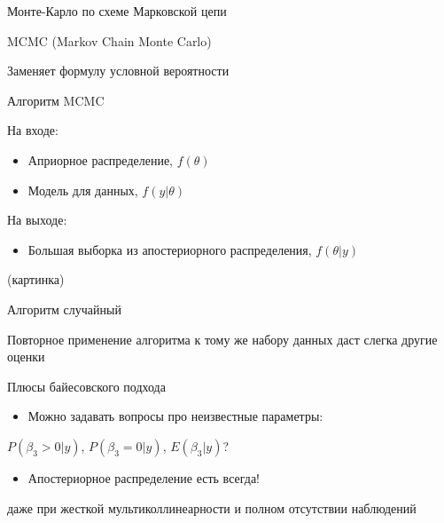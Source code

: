\documentclass[ignorenonframetext,]{beamer}
\begin{document}
\begin{frame}{Монте-Карло по схеме Марковской цепи}

MCMC (Markov Chain Monte Carlo)

Заменяет формулу условной вероятности

\end{frame}

\begin{frame}{Алгоритм MCMC}

На входе:

\begin{itemize}
\item
  Априорное распределение, \(f(\theta)\)
\item
  Модель для данных, \(f(y|\theta)\)
\end{itemize}

На выходе:

\begin{itemize}
\itemsep1pt\parskip0pt
\item
  Большая выборка из апостериорного распределения, \(f(\theta|y)\)
\end{itemize}

(картинка)

\end{frame}

\begin{frame}{Алгоритм случайный}

Повторное применение алгоритма к тому же набору данных даст слегка
другие оценки

\end{frame}

\begin{frame}{Плюсы байесовского подхода}

\begin{itemize}
\itemsep1pt\parskip0pt
\item
  Можно задавать вопросы про неизвестные параметры:
\end{itemize}

\(P(\beta_3 >0 | y)\), \(P(\beta_3=0 | y)\), \(E(\beta_3 | y)\)?

\begin{itemize}
\itemsep1pt\parskip0pt
\item
  Апостериорное распределение есть всегда!
\end{itemize}

даже при жесткой мультиколлинеарности и полном отсутствии наблюдений

\end{frame}
\end{document}
